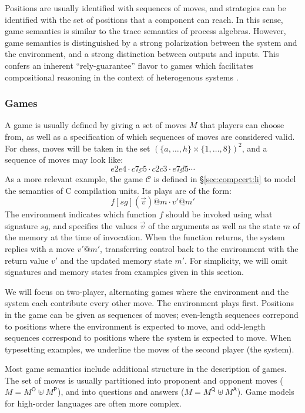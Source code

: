 \documentclass[acmsmall,timestamp,review,anonymous]{acmart}
\newcommand{\kw}[1]{\ensuremath{ \mathsf{#1} }}
\begin{document}
Positions are usually identified with sequences of moves,
and strategies can be identified with the set of positions
that a component can reach.
In this sense,
game semantics is similar to
the trace semantics of process algebras.
However, game semantics is distinguished
by a strong polarization between
the system and the environment,
and a strong distinction between outputs and inputs.
This confers an inherent ``rely-guarantee'' flavor
to games which facilitates compositional reasoning
in the context of heterogenous systems \cite{cspgs}.


\subsubsection{Games} \label{sec:mainideas:gs:games} %

A game is usually defined by giving a set of moves $M$
that players can choose from,
as well as a specification of which
sequences of moves are considered valid.
For chess,
moves will be taken in the set $(\{a, \ldots, h\} \times \{1, \ldots, 8\})^2$,
and a sequence of moves may look like:
\[ e2e4 \cdot \underline{c7c5} \cdot c2c3 \cdot \underline{e7d5} \cdots \]
As a more relevant example,
the game $\mathcal{C}$ is defined in \S\ref{sec:compcert:li}
to model the semantics of C compilation units.
Its plays are of the form:
\[ f[sg](\vec{v})@m \cdot \underline{v'@m'} \]
The environment indicates
which function $f$ should be invoked
using what signature $sg$,
and specifies the values $\vec{v}$ of the arguments
as well as the state $m$ of the memory
at the time of invocation.
When the function returns,
the system replies with a move $v'@m'$,
transferring control back to the environment
with the return value $v'$
and the updated memory state $m'$.
For simplicity,
we will omit signatures and memory states
from examples given in this section.

We will focus on two-player, alternating games
where the environment and the system each contribute every other move.
The environment plays first.
Positions in the game can be given
as sequences of moves;
even-length sequences correpond to positions
where the environment is expected to move,
and odd-length sequences correspond to positions
where the system is expected to move.
When typesetting examples,
we underline the moves of the second player
(the system).

Most game semantics
include additional structure
in the description of games.
The set of moves is usually partitioned
into proponent and opponent moves ($M = M^\kw{O} \uplus M^\kw{P}$),
and into questions and answers ($M = M^\kw{Q} \uplus M^\kw{A}$).
Game models for high-order languages are often more complex.
\end{document}
